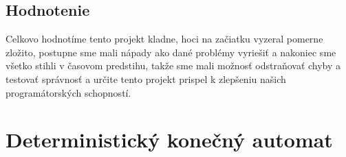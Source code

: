 \documentclass [11pt, a4paper]{article}
\begin{document}
\subsection{Hodnotenie}
Celkovo hodnotíme tento projekt kladne, hoci na začiatku vyzeral pomerne zložito, postupne sme mali nápady ako dané problémy vyriešiť a nakoniec sme všetko stihli v časovom predstihu, takže sme mali možnosť odstraňovať chyby a testovať správnosť a určite tento projekt prispel k zlepšeniu našich programátorských schopností.
\newpage

\renewcommand{\refname}{Použitá literatúra}


\newpage
\appendix

\section{Deterministický konečný automat}
\clearpage
\end{document}
